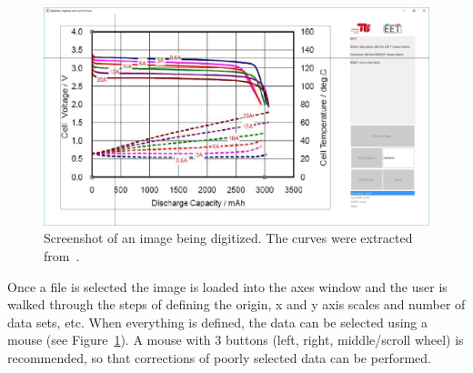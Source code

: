 \begin{figure}[t!]
	\captionsetup{type=figure}
	\centering
	\includegraphics[width=\textwidth]{digitizeTool02.png}
	\caption[Screenshot of an image being digitized]{Screenshot of an image being digitized. The curves were extracted from~\cite{_data_2010}.}
	\label{fig:digitizeTool02}
\end{figure}
Once a file is selected the image is loaded into the axes window and the user is walked through the steps of defining the origin, x and y axis scales and number of data sets, etc. When everything is defined, the data can be selected using a mouse (see Figure~\ref{fig:digitizeTool02}). A mouse with 3 buttons (left, right, middle/scroll wheel) is recommended, so that corrections of poorly selected data can be performed.